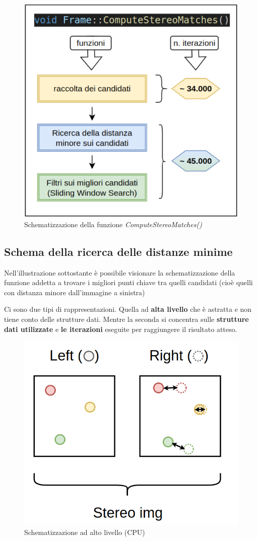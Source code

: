 \documentclass[12pt,a4paper]{report}
\begin{document}
\begin{figure}[H]
    \centering
    \includegraphics[width=0.8\linewidth]{img/ComputeStereo_schema.png}
    \caption{Schematizzazione della funzione \textit{ComputeStereoMatches()} }
\end{figure}

\newpage
\subsection{Schema della ricerca delle distanze minime} \label{ricerca-candidati}

Nell'illustrazione sottostante è possibile visionare la schematizzazione della funzione addetta a trovare i migliori punti chiave tra quelli candidati (cioè quelli con distanza minore dall'immagine a sinistra)

Ci sono due tipi di rappresentazioni. Quella ad \textbf{alta livello} che è astratta e non tiene conto delle strutture dati. Mentre la seconda si concentra sulle \textbf{strutture dati utilizzate} e \textbf{le iterazioni} eseguite per raggiungere il risultato atteso.

\begin{figure}[H]
    \centering
    \includegraphics[width=0.5\linewidth]{img/find_distance_high_scheme.png}
    \caption{Schematizzazione ad alto livello (CPU) }
\end{figure}
\end{document}
